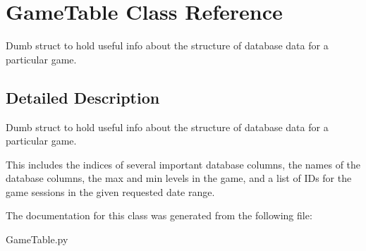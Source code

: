 \hypertarget{class_game_table}{}\section{Game\+Table Class Reference}
\label{class_game_table}


Dumb struct to hold useful info about the structure of database data for a particular game.  




\subsection{Detailed Description}
Dumb struct to hold useful info about the structure of database data for a particular game. 

This includes the indices of several important database columns, the names of the database columns, the max and min levels in the game, and a list of I\+Ds for the game sessions in the given requested date range. 

The documentation for this class was generated from the following file\+:\begin{DoxyCompactItemize}
\item 
Game\+Table.\+py\end{DoxyCompactItemize}
